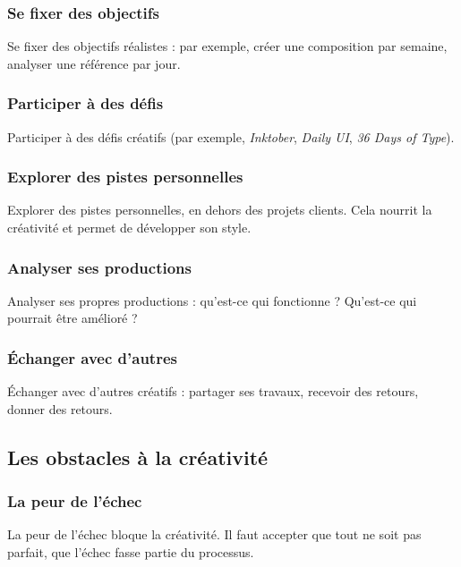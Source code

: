 \subsubsection{Se fixer des objectifs}

Se fixer des objectifs réalistes : par exemple, créer une composition par semaine, analyser une référence par jour.

\subsubsection{Participer à des défis}

Participer à des défis créatifs (par exemple, \emph{Inktober}, \emph{Daily UI}, \emph{36 Days of Type}).

\subsubsection{Explorer des pistes personnelles}

Explorer des pistes personnelles, en dehors des projets clients. Cela nourrit la créativité et permet de développer son style.

\subsubsection{Analyser ses productions}

Analyser ses propres productions : qu'est-ce qui fonctionne ? Qu'est-ce qui pourrait être amélioré ?

\subsubsection{Échanger avec d'autres}

Échanger avec d'autres créatifs : partager ses travaux, recevoir des retours, donner des retours.

\subsection{Les obstacles à la créativité}

\subsubsection{La peur de l'échec}

La peur de l'échec bloque la créativité. Il faut accepter que tout ne soit pas parfait, que l'échec fasse partie du processus.


